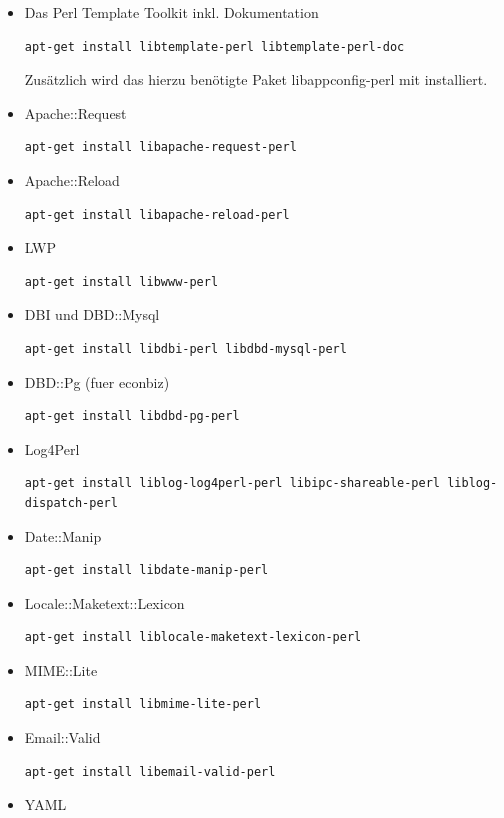 \documentclass[11pt, twoside, a4paper, BCOR8mm, DIV12, bibtotoc,idxtotoc]{scrbook}
\begin{document}
\begin{itemize}
\item Das Perl Template Toolkit inkl. Dokumentation
\begin{verbatim}
apt-get install libtemplate-perl libtemplate-perl-doc
\end{verbatim}
  Zusätzlich wird das hierzu benötigte Paket libappconfig-perl mit
  installiert.
\item Apache::Request
\begin{verbatim}
apt-get install libapache-request-perl
\end{verbatim}
\item Apache::Reload
\begin{verbatim}
apt-get install libapache-reload-perl
\end{verbatim}
\item LWP
\begin{verbatim}
apt-get install libwww-perl
\end{verbatim}
\item DBI und DBD::Mysql
\begin{verbatim}
apt-get install libdbi-perl libdbd-mysql-perl
\end{verbatim}
\item DBD::Pg (fuer econbiz)
\begin{verbatim}
apt-get install libdbd-pg-perl
\end{verbatim}
\item Log4Perl
\begin{verbatim}
apt-get install liblog-log4perl-perl libipc-shareable-perl liblog-dispatch-perl
\end{verbatim}
\item Date::Manip
\begin{verbatim}
apt-get install libdate-manip-perl
\end{verbatim}
\item Locale::Maketext::Lexicon
\begin{verbatim}
apt-get install liblocale-maketext-lexicon-perl
\end{verbatim}
\item MIME::Lite
\begin{verbatim}
apt-get install libmime-lite-perl
\end{verbatim}
\item Email::Valid
\begin{verbatim}
apt-get install libemail-valid-perl
\end{verbatim}
\item YAML
\begin{verbatim}

\end{verbatim}
\end{itemize}
\end{document}
